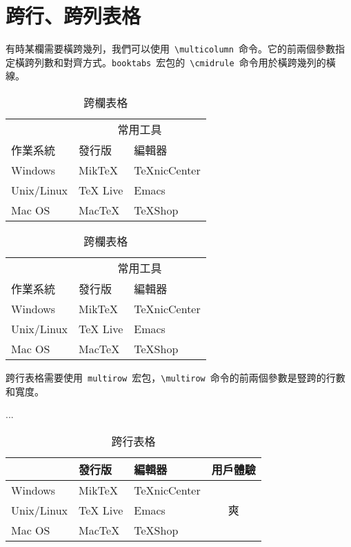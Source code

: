 \section{跨行、跨列表格}
有時某欄需要橫跨幾列，我們可以使用~\verb|\multicolumn|~命令。它的前兩個參數指定橫跨列數和對齊方式。\verb|booktabs|~宏包的~\verb|\cmidrule|~命令用於橫跨幾列的橫線。
\begin{code}
\begin{table}[htbp]
\caption{跨欄表格}
\centering
\begin{tabular}{lll}
    \toprule
    & \multicolumn{2}{c}{常用工具} \\
    \cmidrule{2-3}
    作業系統 & 發行版 & 編輯器 \\
    \midrule
    Windows & MikTeX & TeXnicCenter \\
    Unix/Linux & TeX Live & Emacs \\
    Mac OS & MacTeX & TeXShop \\
    \bottomrule
\end{tabular}
\end{table}
\end{code}

\begin{table}[htbp]
\caption{跨欄表格}
\centering
\begin{tabular}{lll}
    \toprule
    & \multicolumn{2}{c}{常用工具} \\
    \cmidrule{2-3}
    作業系統 & 發行版 & 編輯器 \\
    \midrule
    Windows & MikTeX & TeXnicCenter \\
    Unix/Linux & TeX Live & Emacs \\
    Mac OS & MacTeX & TeXShop \\
    \bottomrule
\end{tabular}
\end{table}

跨行表格需要使用~\verb|multirow|~宏包，\verb|\multirow|~命令的前兩個參數是豎跨的行數和寬度。
\begin{code}
\usepackage{multirow}
...
\begin{table}[htbp]
\caption{跨行表格}
\centering
\begin{tabular}{lllc}
\end{code}
\begin{code}
    \toprule
    作業系統 & 發行版 & 編輯器 & 用戶體驗\\
    \midrule
    Windows & MikTeX & TeXnicCenter & 
    \multirow{3}{*}{\centering 爽} \\
    Unix/Linux & TeX Live & Emacs \\
    Mac OS & MacTeX & TeXShop \\
    \bottomrule
\end{tabular}
\end{table}
\end{code}

